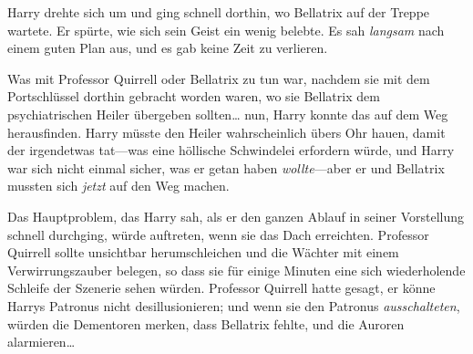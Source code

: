 Harry drehte sich um und ging schnell dorthin, wo Bellatrix auf der Treppe wartete. Er spürte, wie sich sein Geist ein wenig belebte. Es sah \emph{langsam} nach einem guten Plan aus, und es gab keine Zeit zu verlieren.

Was mit Professor Quirrell oder Bellatrix zu tun war, nachdem sie mit dem Portschlüssel dorthin gebracht worden waren, wo sie Bellatrix dem psychiatrischen Heiler übergeben sollten… nun, Harry konnte das auf dem Weg herausfinden. Harry müsste den Heiler wahrscheinlich übers Ohr hauen, damit der irgendetwas tat—was eine höllische Schwindelei erfordern würde, und Harry war sich nicht einmal sicher, was er getan haben \emph{wollte}—aber er und Bellatrix mussten sich \emph{jetzt} auf den Weg machen.

Das Hauptproblem, das Harry sah, als er den ganzen Ablauf in seiner Vorstellung schnell durchging, würde auftreten, wenn sie das Dach erreichten. Professor Quirrell sollte unsichtbar herumschleichen und die Wächter mit einem Verwirrungszauber belegen, so dass sie für einige Minuten eine sich wiederholende Schleife der Szenerie sehen würden. Professor Quirrell hatte gesagt, er könne Harrys Patronus nicht desillusionieren; und wenn sie den Patronus \emph{ausschalteten}, würden die Dementoren merken, dass Bellatrix fehlte, und die Auroren alarmieren…%

